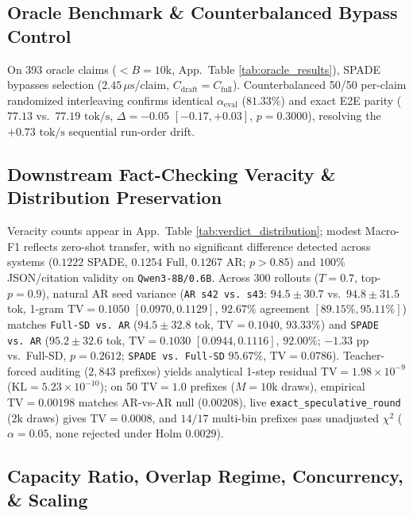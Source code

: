 \documentclass[11pt]{article}
\begin{document}
\subsection{Oracle Benchmark \& Counterbalanced Bypass Control}
\label{sec:oracle}
On 393 oracle claims ($<B=10\text{k}$, App.\ Table \ref{tab:oracle_results}), SPADE bypasses selection ($2.45\,\mu\text{s}$/claim, $C_{\text{draft}}=C_{\text{full}}$). Counterbalanced 50/50 per-claim randomized interleaving confirms identical $\alpha_{\text{eval}}$ ($81.33\%$) and exact E2E parity ($77.13$ vs.\ $77.19\text{ tok/s}$, $\Delta = -0.05$ $[-0.17, +0.03]$, $p=0.3000$), resolving the $+0.73\text{ tok/s}$ sequential run-order drift.



\subsection{Downstream Fact-Checking Veracity \& Distribution Preservation}
\label{sec:veracity}
Veracity counts appear in App.\ Table \ref{tab:verdict_distribution}; modest Macro-F1 reflects zero-shot transfer, with no significant difference detected across systems ($0.1222$ SPADE, $0.1254$ Full, $0.1267$ AR; $p > 0.85$) and $100\%$ JSON/citation validity on \texttt{Qwen3-8B/0.6B}. Across 300 rollouts ($T=0.7$, top-$p=0.9$), natural AR seed variance (\texttt{AR s42 vs.\ s43}: $94.5 \pm 30.7$ vs.\ $94.8 \pm 31.5$ tok, 1-gram $\text{TV}=0.1050$ $[0.0970, 0.1129]$, $92.67\%$ agreement $[89.15\%, 95.11\%]$) matches \texttt{Full-SD vs.\ AR} ($94.5 \pm 32.8$ tok, $\text{TV}=0.1040$, $93.33\%$) and \texttt{SPADE vs.\ AR} ($95.2 \pm 32.6$ tok, $\text{TV}=0.1030$ $[0.0944, 0.1116]$, $92.00\%$; $-1.33\text{ pp}$ vs.\ Full-SD, $p=0.2612$; \texttt{SPADE vs.\ Full-SD} $95.67\%$, $\text{TV}=0.0786$). Teacher-forced auditing ($2,843$ prefixes) yields analytical 1-step residual $\text{TV}=1.98 \times 10^{-9}$ ($\text{KL}=5.23 \times 10^{-10}$); on 50 $\text{TV}=1.0$ prefixes ($M=10\text{k}$ draws), empirical $\text{TV}=0.00198$ matches AR-vs-AR null ($0.00208$), live \texttt{exact\_speculative\_round} ($2\text{k}$ draws) gives $\text{TV}=0.0008$, and $14/17$ multi-bin prefixes pass unadjusted $\chi^2$ ($\alpha=0.05$, none rejected under Holm $0.0029$).

\subsection{Capacity Ratio, Overlap Regime, Concurrency, \& Scaling}
\label{sec:qwen25_generalization}
\end{document}
